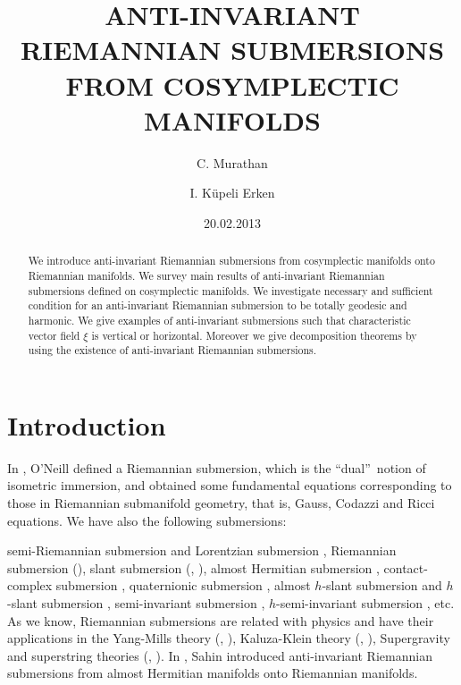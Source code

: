 \documentclass{amsart}
\theoremstyle{plain}
\numberwithin{equation}{section}
\begin{document}
\title{ANTI-INVARIANT RIEMANNIAN SUBMERSIONS FROM COSYMPLECTIC MANIFOLDS}
\author{C. Murathan}
\address{Art and Science Faculty,Department of Mathematics, Uludag
University, 16059 Bursa, TURKEY}
\author{I. K\"{u}peli Erken}
\address{Art and Science Faculty,Department of Mathematics, Uludag
University, 16059 Bursa, TURKEY}
\date{20.02.2013}

\begin{abstract}
We introduce anti-invariant Riemannian submersions from cosymplectic
manifolds onto Riemannian manifolds. We survey main results of
anti-invariant Riemannian submersions defined on cosymplectic manifolds. We
investigate necessary and sufficient condition for an anti-invariant
Riemannian submersion to be totally geodesic and harmonic. We give examples
of anti-invariant submersions such that characteristic vector field $\xi $
is vertical or horizontal. Moreover we give decomposition theorems by using
the existence of anti-invariant Riemannian submersions.
\end{abstract}

\maketitle

\section{\textbf{Introduction}}

In \cite{BO1}, O'Neill defined a Riemannian submersion, which is the
\textquotedblleft dual\textquotedblright\ notion of isometric immersion, and
obtained some fundamental equations corresponding to those in Riemannian
submanifold geometry, that is, Gauss, Codazzi and Ricci equations. We have
also the following submersions:

semi-Riemannian submersion and Lorentzian submersion \cite{FAL}, Riemannian
submersion (\cite{GRAY}), slant submersion (\cite{CHEN}, \cite{SAHIN1}),
almost Hermitian submersion \cite{WAT}, contact-complex submersion \cite{IANUS}, quaternionic submersion \cite{IANUS2}, almost $h$-slant submersion
and $h$-slant submersion \cite{PARK1}, semi-invariant submersion \cite{SAHIN2}, $h$-semi-invariant submersion \cite{PARK2}, etc. As we know,
Riemannian submersions are related with physics and have their applications
in the Yang-Mills theory (\cite{BL}, \cite{WATSON}), Kaluza-Klein theory (\cite{BOL}, \cite{IV}), Supergravity and superstring theories (\cite{IV2}, 
\cite{MUS}). In \cite{SAHIN}, Sahin introduced anti-invariant Riemannian
submersions from almost Hermitian manifolds onto Riemannian manifolds.
\end{document}
